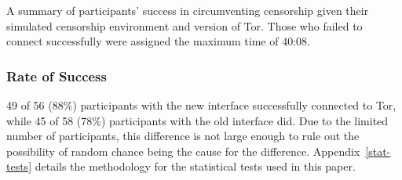 \documentclass[USenglish,oneside,twocolumn]{article}
\begin{document}
{%




\begin{table}
\centering

\caption{
A summary of participants' success in circumventing censorship
given their simulated censorship environment and version of Tor. Those who
failed to connect successfully were assigned the maximum time of 40:08.
}
\label{table:participant-summary}
\end{table}

\subsubsection{Rate of Success} 
49 of 56 (88\%) participants with the new interface successfully connected to Tor, while 45 of 58 (78\%) participants with the old interface did. Due to the limited number of participants, this difference is not large enough to rule out the possibility of random chance being the cause for the difference. Appendix~\ref{stat-tests} details the methodology for the statistical tests used in this paper. 


}
\end{document}
